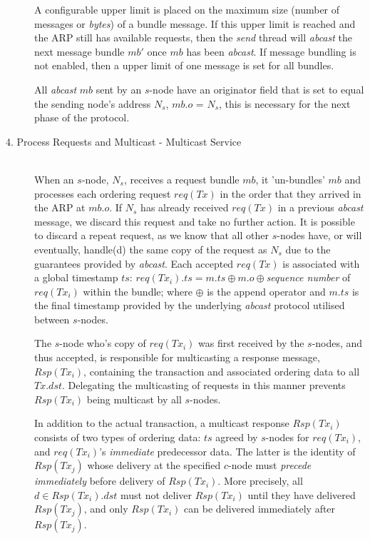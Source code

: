 \begin{description}
		A configurable upper limit is placed on the maximum size (number of messages or \emph{bytes}) of a bundle message.  If this upper limit is reached and the ARP still has available requests, then the \emph{send} thread will \emph{abcast} the next message bundle $mb'$ once $mb$ has been \emph{abcast}.  If message bundling is not enabled, then a upper limit of one message is set for all bundles.    
		
		All \emph{abcast} $mb$ sent by an $s$-node have an originator field that is set to equal the sending node's address $N_s$, $mb.o$ = $N_s$, this is necessary for the next phase of the protocol.  
		
		\item[4. Process Requests and Multicast - Multicast Service] \hfill \\
		When an $s$-node, $N_s$, receives a request bundle $mb$, it 'un-bundles' $mb$ and processes each ordering request $req(Tx)$ in the order that they arrived in the ARP at $mb.o$.  If $N_s$ has already received $req(Tx)$ in a previous \emph{abcast} message, we discard this request and take no further action.  It is possible to discard a repeat request, as we know that all other $s$-nodes have, or will eventually, handle(d) the same copy of the request as $N_s$ due to the guarantees provided by \emph{abcast}.  Each accepted $req(Tx)$ is associated with a global timestamp $ts$: $req(Tx_i).ts = m.ts\oplus m.o \oplus$\emph{sequence number} of $req(Tx_i)$ within the bundle; where $\oplus$ is the append operator and $m.ts$ is the final timestamp provided by the underlying \emph{abcast} protocol utilised between $s$-nodes.  
		
		The $s$-node who's copy of $req(Tx_i)$ was first received by the $s$-nodes, and thus accepted, is responsible for multicasting a response message, $Rsp(Tx_i)$, containing the transaction and associated ordering data to all $Tx.dst$.  Delegating the multicasting of requests in this manner prevents $Rsp(Tx_i)$ being multicast by all $s$-nodes.  
		
		In addition to  the actual transaction, a multicast response $Rsp(Tx_i)$ consists of two types of ordering data: $ts$ agreed by $s$-nodes for $req(Tx_i)$, and $req(Tx_i)$'s \emph{immediate} predecessor data.  The latter is the identity of $Rsp(Tx_j)$ whose delivery at the specified $c$-node must \emph{precede} \emph{immediately} before delivery of $Rsp(Tx_i)$.  More precisely, all $d \in Rsp(Tx_i).dst$ must not deliver $Rsp(Tx_i)$ until they have delivered $Rsp(Tx_j)$, and only $Rsp(Tx_i)$ can be delivered immediately after $Rsp(Tx_j)$.
		

\end{description}
